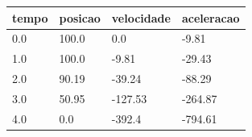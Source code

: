 \begin{tabular}{llll}
\toprule
tempo & posicao & velocidade & aceleracao \\
\midrule
0.0 & 100.0 & 0.0 & -9.81 \\
1.0 & 100.0 & -9.81 & -29.43 \\
2.0 & 90.19 & -39.24 & -88.29 \\
3.0 & 50.95 & -127.53 & -264.87 \\
4.0 & 0.0 & -392.4 & -794.61 \\
\bottomrule
\end{tabular}
